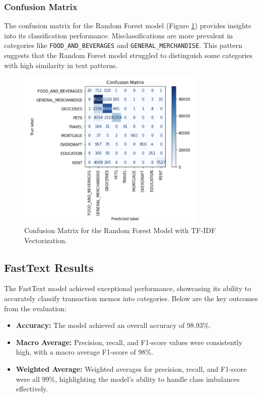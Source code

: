 \documentclass[12pt,letterpaper]{article}
\begin{document}
\subsubsection{Confusion Matrix}
The confusion matrix for the Random Forest model (Figure \ref{fig:confusion_matrix_rf}) provides insights into its classification performance. Misclassifications are more prevalent in categories like \texttt{FOOD\_AND\_BEVERAGES} and \texttt{GENERAL\_MERCHANDISE}. This pattern suggests that the Random Forest model struggled to distinguish some categories with high similarity in text patterns.

\begin{figure}[h]
    \centering
    \includegraphics[width=0.8\textwidth]{figure/random_forest_confusion.png}
    \caption{Confusion Matrix for the Random Forest Model with TF-IDF Vectorization.}
    \label{fig:confusion_matrix_rf}
\end{figure}

\subsection{FastText Results}
The FastText model achieved exceptional performance, showcasing its ability to accurately classify transaction memos into categories. Below are the key outcomes from the evaluation:

\begin{itemize}
    \item \textbf{Accuracy:} The model achieved an overall accuracy of 98.93\%.
    \item \textbf{Macro Average:} Precision, recall, and F1-score values were consistently high, with a macro average F1-score of 98\%.
    \item \textbf{Weighted Average:} Weighted averages for precision, recall, and F1-score were all 99\%, highlighting the model's ability to handle class imbalances effectively.
\end{itemize}
\end{document}
